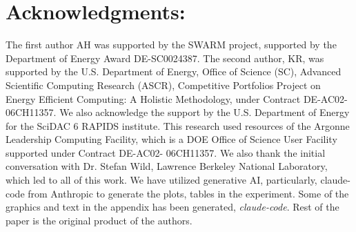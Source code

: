 \section*{Acknowledgments:} 
The first author AH was supported by the SWARM project, supported by the Department of Energy Award DE-SC0024387. The second author, KR, was supported by the U.S. Department of Energy, Office of Science (SC), Advanced Scientific Computing Research (ASCR), Competitive Portfolios Project on Energy Efficient Computing: A Holistic Methodology, under Contract DE-AC02-06CH11357. We also acknowledge the support by the U.S. Department of Energy for the SciDAC 6 RAPIDS institute. This research used resources of the Argonne Leadership Computing Facility, which is a DOE Office of Science User Facility supported under Contract DE-AC02- 06CH11357. We also thank the initial conversation with Dr. Stefan Wild, Lawrence Berkeley National Laboratory, which led to all of this work. We have utilized generative AI, particularly, claude-code from Anthropic to generate the plots, tables in the experiment. Some of the graphics and text in the appendix has been generated, \emph{claude-code}. Rest of the paper is the original product of the authors.
